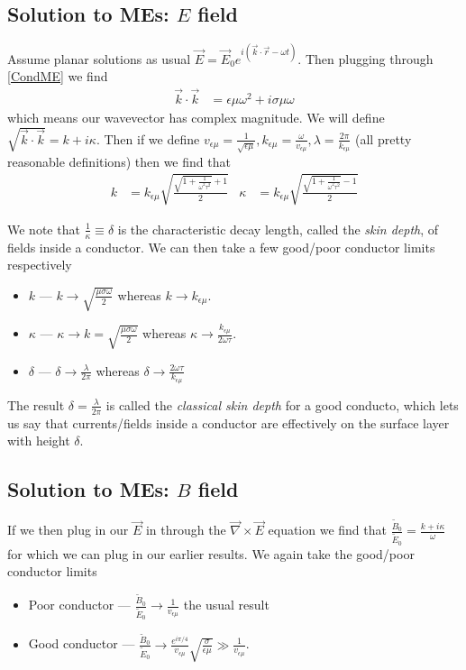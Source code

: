\documentclass[10pt,twocolumn]{article}
\begin{document}
\subsection{Solution to MEs: $E$ field}

Assume planar solutions as usual $\vec{E} = \vec{E}_0 e^{i(\vec{k} \cdot \vec{r} - \omega t)}$. Then plugging through \eqref{CondME} we find
\begin{align}
    \vec{k} \cdot \vec{k} &= \epsilon \mu \omega^2 + i\sigma \mu \omega
\end{align}
which means our wavevector has complex magnitude. We will define $\sqrt{\vec{k} \cdot \vec{k}} = k + i\kappa$. Then if we define $v_{\epsilon \mu} = \frac{1}{\sqrt{\epsilon \mu}}, k_{\epsilon \mu} = \frac{\omega}{v_{\epsilon \mu}}, \lambda = \frac{2\pi}{k_{\epsilon \mu}}$ (all pretty reasonable definitions) then we find that
\begin{align}
    k &= k_{\epsilon \mu}\sqrt{\frac{\sqrt{1 + \frac{1}{\omega^2\tau^2}}+ 1}{2}} & \kappa &= k_{\epsilon \mu} \sqrt{\frac{\sqrt{1 + \frac{1}{\omega^2 \tau^2}}-1}{2}}
\end{align}

We note that $\frac{1}{\kappa} \equiv \delta$ is the characteristic decay length, called the \emph{skin depth}, of fields inside a conductor. We can then take a few good/poor conductor limits respectively
\begin{itemize}
    \item $k$ --- $k \to \sqrt{\frac{\mu \sigma \omega}{2}}$ whereas $k \to k_{\epsilon \mu}$.
    \item $\kappa$ --- $\kappa \to k = \sqrt{\frac{\mu \sigma \omega}{2}}$ whereas $\kappa \to \frac{k_{\epsilon \mu}}{2 \omega \tau}$.
    \item $\delta$ --- $\delta \to \frac{\lambda}{2\pi}$ whereas $\delta \to \frac{2 \omega \tau}{k_{\epsilon \mu}}$
\end{itemize}

The result $\delta = \frac{\lambda}{2\pi}$ is called the \emph{classical skin depth} for a good conducto, which lets us say that currents/fields inside a conductor are effectively on the surface layer with height $\delta$. 

\subsection{Solution to MEs: $B$ field}

If we then plug in our $\vec{E}$ in through the $\vec{\nabla} \times \vec{E}$ equation we find that $\frac{\tilde{B}_0}{\tilde{E}_0} = \frac{k+i\kappa}{\omega}$ for which we can plug in our earlier results. We again take the good/poor conductor limits
\begin{itemize}
    \item Poor conductor --- $\frac{\tilde{B}_0}{\tilde{E}_0} \to \frac{1}{v_{\epsilon \mu}}$ the usual result
    \item Good conductor --- $\frac{\tilde{B}_0}{\tilde{E}_0} \to \frac{e^{i\pi/4}}{v_{\epsilon \mu}}\sqrt{\frac{\sigma}{\epsilon \mu}} \gg \frac{1}{v_{\epsilon \mu}}$.
\end{itemize}
\end{document}
